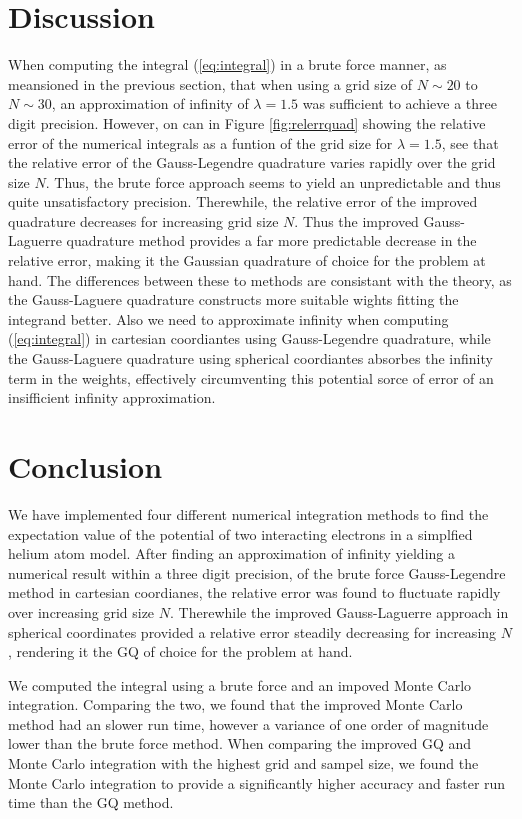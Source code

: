\documentclass[10pt, twocolumn]{aastex62}
\begin{document}
\section{Discussion} \label{sec:discussion}
When computing the integral (\ref{eq:integral}) in a brute force manner, as
meansioned in the previous section, that when using a grid size of $N\sim20$ to
$N\sim30$, an approximation of infinity of $\lambda = 1.5$ was sufficient to
achieve a three digit precision. However, on can in Figure \ref{fig:relerrquad}
showing the relative error of the numerical integrals as a funtion of the grid
size for $\lambda = 1.5$, see that the relative error of the Gauss-Legendre
quadrature varies rapidly over the grid size $N$. Thus, the brute force approach
seems to yield an unpredictable and thus quite unsatisfactory precision.
Therewhile, the relative error of the improved quadrature decreases for
increasing grid size $N$. Thus the improved Gauss-Laguerre quadrature method
provides a far more predictable decrease in the relative error, making it the
Gaussian quadrature of choice for the problem at hand. The differences between
these to methods are consistant with the theory, as the Gauss-Laguere quadrature
constructs more suitable wights fitting the integrand better. Also we need to
approximate infinity when computing (\ref{eq:integral}) in cartesian coordiantes
using Gauss-Legendre quadrature, while the Gauss-Laguere quadrature using
spherical coordiantes absorbes the infinity term in the weights, effectively
circumventing this potential sorce of error of an insifficient infinity
approximation.


\section{Conclusion} \label{sec:conclusion}
We have implemented four different numerical integration methods to find the
expectation value of the potential of two interacting electrons in a simplfied
helium atom model. After finding an approximation of infinity yielding a
numerical result within a three digit precision, of the brute force
Gauss-Legendre method in cartesian coordianes, the relative error was found to
fluctuate rapidly over increasing grid size $N$. Therewhile the improved
Gauss-Laguerre approach in spherical coordinates provided a relative error
steadily decreasing for increasing $N$, rendering it the GQ of choice for the
problem at hand. 

We computed the integral using a brute force and an impoved Monte Carlo
integration. Comparing the two, we found that the improved Monte Carlo method
had an slower run time, however a variance of one order of magnitude lower than
the brute force method. When comparing the improved GQ and Monte Carlo
integration with the highest grid and sampel size, we found the Monte Carlo
integration to provide a significantly higher accuracy and faster run time than
the GQ method.
\end{document}
